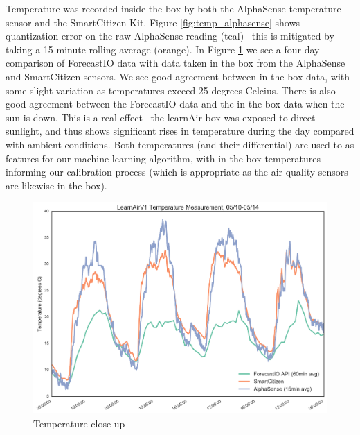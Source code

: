Temperature was recorded inside the box by both the AlphaSense temperature sensor and the SmartCitizen Kit.  Figure \ref{fig:temp_alphasense} shows quantization error on the raw AlphaSense reading (teal)-- this is mitigated by taking a 15-minute rolling average (orange).  In Figure \ref{fig:temp_zoomed} we see a four day comparison of ForecastIO data with data taken in the box from the AlphaSense and SmartCitizen sensors.    We see good agreement between in-the-box data, with some slight variation as temperatures exceed 25 degrees Celcius.  There is also good agreement between the ForecastIO data and the in-the-box data when the sun is down.  This is a real effect-- the learnAir box was exposed to direct sunlight, and thus shows significant rises in temperature during the day compared with ambient conditions.  Both temperatures (and their differential) are used to as features for our machine learning algorithm, with in-the-box temperatures informing our calibration process (which is appropriate as the air quality sensors are likewise in the box).   

\begin{figure}[htb]
 	\includegraphics[width=\textwidth]{figs/temp_zoomed}               
 	 \caption{Temperature close-up}
  	\label{fig:temp_zoomed}
\end{figure}

